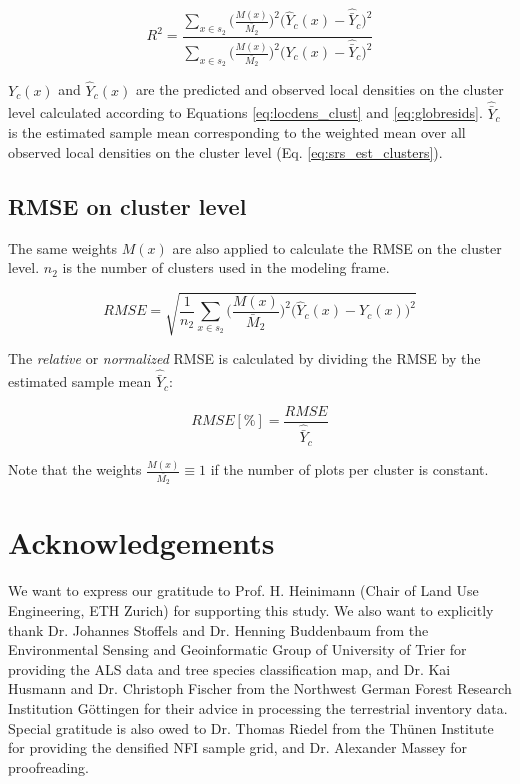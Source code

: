 \begin{equation*}\label{eq:R_squared_clust}
R^2 =  \frac{\sum_{x \in s_2} \Big(\frac{M(x)}{\bar{M_2}}\Big)^2 \Big(\hat{Y}_{c}(x)-\hat{\bar{Y}}_c\Big)^2}{\sum_{x \in s_2} \Big(\frac{M(x)}{\bar{M_2}}\Big)^2 \Big(Y_{c}(x)-\hat{\bar{Y}}_c\Big)^2}
\end{equation*}

\noindent $Y_c(x)$ and $\hat{Y}_{c}(x)$ are the predicted and observed local densities on the cluster level calculated according to Equations \ref{eq:locdens_clust} and \ref{eq:globresids}. $\hat{\bar{Y}}_c$ is the estimated sample mean corresponding to the weighted mean over all observed local densities on the cluster level (Eq. \ref{eq:srs_est_clusters}).\par

\subsection*{RMSE on cluster level}

The same weights $M(x)$ are also applied to calculate the RMSE on the cluster level. $n_2$ is the number of clusters used in the modeling frame.

\begin{equation*}\label{eq:RMSE_clust}
RMSE= \sqrt{\frac{1}{n_{2}}  \sum_{x \in s_2} \Big(\frac{M(x)}{\bar{M}_2}\Big)^2 \Big(\hat{Y}_{c}(x)-Y_c(x)\Big)^2}
\end{equation*}

\noindent The \textit{relative} or \textit{normalized} RMSE is calculated by dividing the RMSE by the estimated sample mean $\hat{\bar{Y}}_c$:

\begin{equation*}\label{eq:NRMSE_clust}
RMSE[\%] = \frac{RMSE}{\hat{\bar{Y}}_c}
\end{equation*}

\noindent Note that the weights $\frac{M(x)}{\bar{M_2}} \equiv 1$ if the number of plots per cluster is constant.



\section*{Acknowledgements}
We want to express our gratitude to Prof. H. Heinimann (Chair of Land Use Engineering, ETH Zurich) for supporting this study. We also want to explicitly thank Dr. Johannes Stoffels and Dr. Henning Buddenbaum from the Environmental Sensing and Geoinformatic Group of University of Trier for providing the ALS data and tree species classification map, and Dr. Kai Husmann and Dr. Christoph Fischer from the Northwest German Forest Research Institution G{\"o}ttingen for their advice in processing the terrestrial inventory data. Special gratitude is also owed to Dr. Thomas Riedel from the Th{\"u}nen Institute for providing the densified NFI sample grid, and Dr. Alexander Massey for proofreading.
